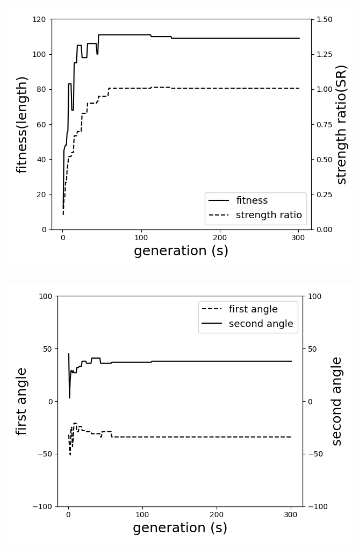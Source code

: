 \begin{figure}[!htb]
	\centering
		\begin{subfigure}[b]{0.8\linewidth}
			\includegraphics[width=\linewidth]{2020-11-10-pre-image/two_distinct_angle_fitness_and_sr.png}
		\end{subfigure}

		\begin{subfigure}[b]{0.8\linewidth}
			\includegraphics[width=\linewidth]{2020-11-10-pre-image/two_distinct_angle_angle_change.png}
		\end{subfigure}


\end{figure}
